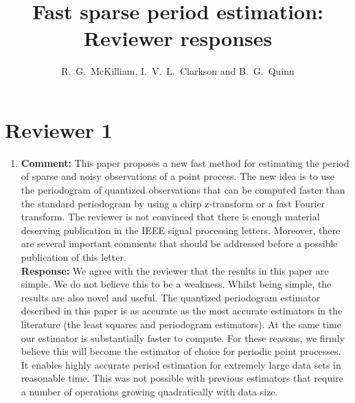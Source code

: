 \documentclass[a4paper,10pt]{article}
\title{Fast sparse period estimation: Reviewer responses}
\author{R.~G.~McKilliam, I.~V.~L.~Clarkson and B.~G.~Quinn 
}
\begin{document}
\maketitle


\section*{Reviewer 1}\label{sec:reviewer-1}

\begin{enumerate}
 
\item\textbf{Comment:}
This paper proposes a new fast method for estimating the period of sparse and noisy
observations of a point process. The new idea is to use the periodogram of quantized
observations that can be computed faster than the standard periodogram by using
a chirp z-transform or a fast Fourier transform. The reviewer is not convinced that
there is enough material deserving publication in the IEEE signal processing letters.
Moreover, there are several important comments that should be addressed before a
possible publication of this letter.
\\
\textbf{Response:}
We agree with the reviewer that the results in this paper are simple.  We do not believe this to be a weakness. Whilst being simple, the results are also novel and useful.  The quantized periodogram estimator described in this paper is as accurate as the most accurate estimators in the literature (the least squares and periodogram estimators).  At the same time our estimator is substantially faster to compute.  For these reasons, we firmly believe this will become the estimator of choice for periodic point processes.  It enables highly accurate period estimation for extremely large data sets in reasonable time. This was not possible with previous estimators that require a number of operations growing quadratically with data size. %


\end{enumerate}
\end{document}
